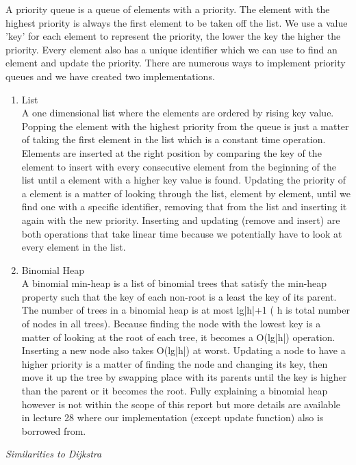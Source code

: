\documentclass[12pt, a4paper]{article}
\begin{document}
A priority queue is a queue of elements with a priority. The element with the highest priority is always the first element to be taken off the list. We use a value 'key'  for each element to represent the priority, the lower the key the higher the priority. Every element also has a unique identifier which we can use to find an element and update the priority.  There are numerous ways to implement priority queues and we have created two implementations.

\begin{enumerate}
\item{List}\\
A one dimensional list where the elements are ordered by rising key value. Popping the element with the highest priority from the queue is just a matter of taking the first element in the list which is a constant time operation. Elements are inserted at the right position by comparing the key of the element to insert with every consecutive element from the beginning of the list until a element with a higher key value is found. Updating the priority of a element is a matter of looking through the list, element by element, until we find one with a specific identifier, removing that from the list and inserting it again with the new priority. Inserting and updating (remove and insert) are both operations that take linear time because we potentially have to look at every element in the list.

\item{Binomial Heap}\\
A binomial min-heap is a list of binomial trees that satisfy the min-heap property such that the key of each non-root is a least the key of its parent. The number of trees in a binomial heap is at most lg|h|+1 ( h is total number of nodes in all trees). Because finding the node with the lowest key is a matter of looking at the root of each tree, it becomes a O(lg|h|) operation. Inserting a new node also takes O(lg|h|) at worst. Updating a node to have a higher priority is a matter of finding the node and changing its key, then move it up the tree by swapping place with its parents until the key is higher than the parent or it becomes the root. Fully explaining a binomial heap however is not within the scope of this report but more details are available in lecture 28 \cite{lecture28} where our implementation (except update function) also is borrowed from.

\end{enumerate}

\textit{Similarities to Dijkstra}
\end{document}
